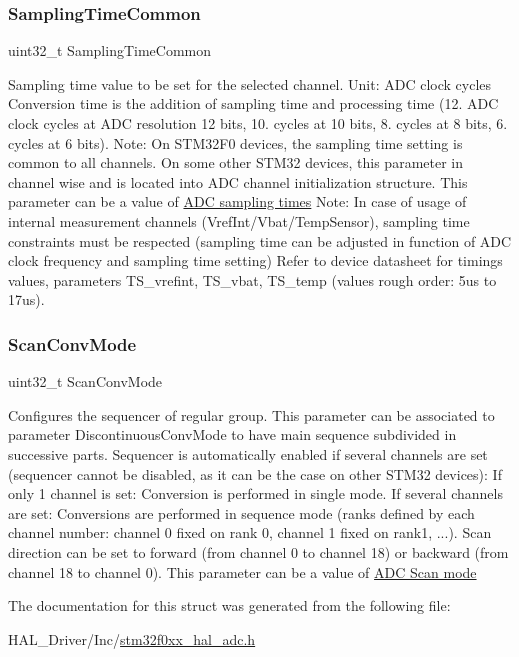 \subsubsection{\texorpdfstring{Sampling\+Time\+Common}{SamplingTimeCommon}}
{\footnotesize\ttfamily uint32\+\_\+t Sampling\+Time\+Common}

Sampling time value to be set for the selected channel. Unit\+: A\+DC clock cycles Conversion time is the addition of sampling time and processing time (12. A\+DC clock cycles at A\+DC resolution 12 bits, 10. cycles at 10 bits, 8. cycles at 8 bits, 6. cycles at 6 bits). Note\+: On S\+T\+M32\+F0 devices, the sampling time setting is common to all channels. On some other S\+T\+M32 devices, this parameter in channel wise and is located into A\+DC channel initialization structure. This parameter can be a value of \hyperlink{group___a_d_c__sampling__times}{A\+DC sampling times} Note\+: In case of usage of internal measurement channels (Vref\+Int/\+Vbat/\+Temp\+Sensor), sampling time constraints must be respected (sampling time can be adjusted in function of A\+DC clock frequency and sampling time setting) Refer to device datasheet for timings values, parameters T\+S\+\_\+vrefint, T\+S\+\_\+vbat, T\+S\+\_\+temp (values rough order\+: 5us to 17us). \mbox{\label{struct_a_d_c___init_type_def_a67902b5cdd3d1aa4af49654409412a08}} 
\subsubsection{\texorpdfstring{Scan\+Conv\+Mode}{ScanConvMode}}
{\footnotesize\ttfamily uint32\+\_\+t Scan\+Conv\+Mode}

Configures the sequencer of regular group. This parameter can be associated to parameter \textquotesingle{}Discontinuous\+Conv\+Mode\textquotesingle{} to have main sequence subdivided in successive parts. Sequencer is automatically enabled if several channels are set (sequencer cannot be disabled, as it can be the case on other S\+T\+M32 devices)\+: If only 1 channel is set\+: Conversion is performed in single mode. If several channels are set\+: Conversions are performed in sequence mode (ranks defined by each channel number\+: channel 0 fixed on rank 0, channel 1 fixed on rank1, ...). Scan direction can be set to forward (from channel 0 to channel 18) or backward (from channel 18 to channel 0). This parameter can be a value of \hyperlink{group___a_d_c___scan__mode}{A\+DC Scan mode} 

The documentation for this struct was generated from the following file\+:\begin{DoxyCompactItemize}
\item 
H\+A\+L\+\_\+\+Driver/\+Inc/\hyperlink{stm32f0xx__hal__adc_8h}{stm32f0xx\+\_\+hal\+\_\+adc.\+h}\end{DoxyCompactItemize}

